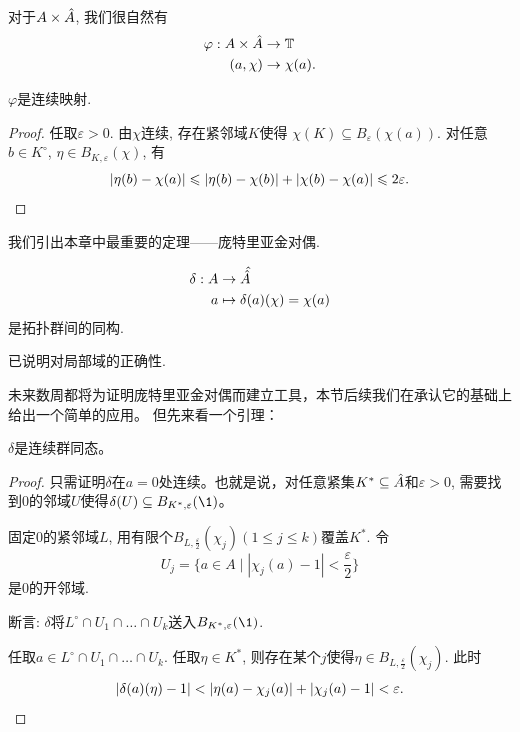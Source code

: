 对于$A \times \hat{A}$, 我们很自然有\begin{align*}
    \varphi:A \times \hat{A} & \to \mathbb{T} \\ (a,\chi) & \to \chi(a).
\end{align*}
\begin{proposition}
    $\varphi$是连续映射.
\end{proposition}
\begin{proof}
    任取$\varepsilon > 0$. 由$\chi$连续, 存在紧邻域$K$使得
    $\chi(K) \subseteq B_\varepsilon(\chi(a))$. 
    对任意$b \in K^\circ$, $\eta \in B_{K,\varepsilon}(\chi)$, 有
    \[|\eta(b) - \chi(a)| \leqslant |\eta(b) - \chi(b)| + |\chi(b) - \chi(a)| 
    \leqslant 2\varepsilon.\qedhere\]
\end{proof}
我们引出本章中最重要的定理——庞特里亚金对偶.
\begin{theorem}[庞特里亚金对偶]\label{ptlyj}
    \begin{equation*}
        \begin{split}
            \delta:A & \to \,\hat{\!\hat{A}} \\ a & \mapsto \delta(a)(\chi) = \chi(a)
        \end{split}
    \end{equation*}是拓扑群间的同构.
\end{theorem}
\begin{remark}
    已说明对局部域的正确性.
\end{remark}
未来数周都将为证明庞特里亚金对偶而建立工具，本节后续我们在承认它的基础上给出一个简单的应用。
但先来看一个引理：
\begin{lemma}
    $\delta$是连续群同态。
\end{lemma}
\begin{proof}
    只需证明$\delta$在$a = 0$处连续。也就是说，对任意紧集$K^* \subseteq \hat{A}$和$\varepsilon > 0$, 需要找到$0$的邻域$U$使得$\delta(U) \subseteq B_{K^*,\varepsilon}(\1)$。

    固定$0$的紧邻域$L$, 用有限个$B_{L,\frac{\varepsilon}{2}}(\chi_j)(1 \leqslant j \leqslant k)$覆盖$K^*$. 令\[U_j = \{a \in A \mid |\chi_j(a) - 1| < \frac{\varepsilon}{2}\}\]是$0$的开邻域.

    断言: $\delta$将$L^\circ \cap U_1 \cap \ldots \cap U_k$送入$B_{K^*,\varepsilon}(\1)$.

    任取$a \in L^\circ \cap U_1 \cap \ldots \cap U_k$. 
    任取$\eta \in K^*$, 则存在某个$j$使得$\eta \in B_{L,\frac{\varepsilon}{2}}(\chi_j)$. 此时
    \[|\delta(a)(\eta)-1| <|\eta(a) - \chi_j(a)| + |\chi_j(a) - 1| < \varepsilon.\qedhere\]
\end{proof}

